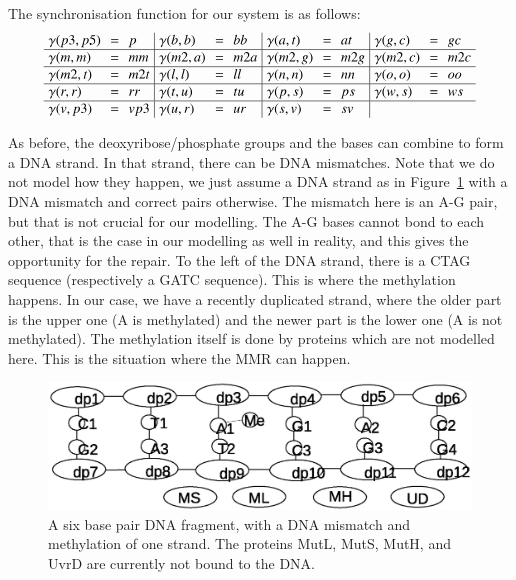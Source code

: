 \documentclass[review]{elsarticle}
\begin{document}
The synchronisation function for our system is as follows:
%
\[\arraycolsep=3.4pt\def\arraystretch{1.0}
\begin{array}{ l c l | l c l | l c l | l c l}
\gamma(p3,p5) & = & p & \gamma(b,b) & = & bb & \gamma(a,t) & = & at &  \gamma(g,c) & = & gc \\
\hline
\gamma(m,m) & = & mm & \gamma(m2,a) & = & m2a & \gamma(m2, g) & = & m2g & \gamma(m2,c) & = & m2c \\
\hline
\gamma(m2,t) & = & m2t & \gamma(l,l) & = & ll &\gamma(n,n) & = & nn & \gamma(o,o) & = & oo\\
\hline
\gamma(r,r) & = & rr & \gamma(t,u) & = & tu &\gamma(p,s) & = & ps &\gamma(w,s) & = & ws\\
\hline
\gamma(v,p3) & = & vp3 &  \gamma(u,r) & = & ur  & \gamma(s,v) & = & sv & & & \\
\end{array}
\]

As before, the deoxyribose/phosphate groups and the bases can combine to form a DNA strand. In that strand, there can be DNA mismatches. Note that we do not model how they happen, we just assume a DNA strand as in Figure~\ref{fig:state1} with a DNA mismatch and correct pairs otherwise. The mismatch here is an A-G pair, but that is not crucial for our modelling. The A-G bases cannot bond to each other, that is the case in our modelling as well in reality, and this gives the opportunity for the repair. To the left of the DNA strand, there is a CTAG sequence (respectively a GATC sequence). This is where the methylation happens. In our case, we have a recently duplicated strand, where the older part is the upper one (A is methylated) and the newer part is the lower one (A is not methylated). The methylation itself is done by proteins which are not modelled here. This is the situation where the MMR can happen.

\begin{figure}[h!]
  \centering
    \includegraphics[width=1.0\textwidth]{mmr/state1}
  \caption[A six base pair DNA fragment.]{A six base pair DNA fragment, with a DNA mismatch and methylation of one strand. The proteins MutL, MutS, MutH, and UvrD are currently not bound to the DNA.}
  \label{fig:state1}
\end{figure}
\end{document}
